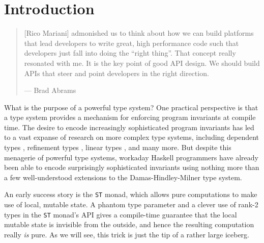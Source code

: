 \documentclass[format=sigplan, review=false, screen=true]{acmart}
\begin{document}
%
%



\maketitle

\renewcommand{\shortauthors}{M. Noonan}

%

\section{Introduction}
\begin{quote}
  [Rico Mariani] admonished us to think about how we can build platforms that lead developers to write great, high performance code such that developers just fall into doing the ``right thing''. That concept really resonated with me. It is the key point of good API design. We should build APIs that steer and point developers in the right direction.
  
  \hfill --- Brad Abrams \cite{pitofsuccess}
\end{quote}

What is the purpose of a powerful type system? One practical perspective is
that a type system provides a mechanism for enforcing program
invariants at compile time. The desire to encode increasingly
sophisticated program invariants has led to a vast expanse of research
on more complex type systems, including dependent types \cite{augustsson1998cayenne,bove2009dependent}, refinement types \cite{freeman1991refinement}, linear
types \cite{wadler1990linear}, and many more. But despite this menagerie of powerful
type systems, workaday Haskell programmers have already been able to encode
surprisingly sophisticated invariants using nothing more than a
few well-understood extensions to the Damas-Hindley-Milner type system.

An early success story is the \texttt{ST} monad, which allows pure
computations to make use of local, mutable state. A phantom type parameter
and a clever use of rank-2 types in the \texttt{ST} monad's API gives
a compile-time guarantee that the local mutable state is invisible from the outside,
and hence the resulting computation really \emph{is} pure. As we will see, this
trick is just the tip of a rather large iceberg.
\end{document}
